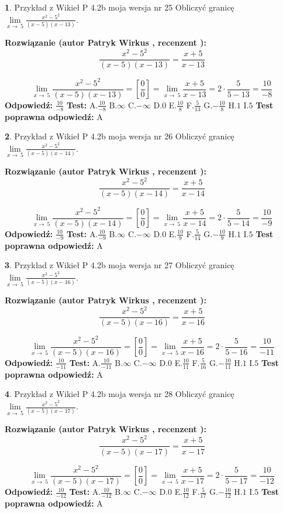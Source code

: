 \documentclass[12pt, a4paper]{article}
\theoremstyle{definition} %
\newtheorem{zad}{}
\newcommand{\zadStart}[1]{\begin{zad}#1\newline}
\newcommand{\zadStop}{\end{zad}}
\newcommand{\rozwStart}[2]{\noindent \textbf{Rozwiązanie (autor #1 , recenzent #2): }\newline}
\newcommand{\rozwStop}{\newline}
\newcommand{\odpStart}{\noindent \textbf{Odpowiedź:}\newline}
\newcommand{\odpStop}{\newline}
\newcommand{\testStart}{\noindent \textbf{Test:}\newline}
\newcommand{\testStop}{\newline}
\newcommand{\kluczStart}{\noindent \textbf{Test poprawna odpowiedź:}\newline}
\newcommand{\kluczStop}{\newline}
\begin{document}
\zadStart{Przykład z Wikieł P 4.2b moja wersja nr 25}
Obliczyć granicę $\lim\limits_{x\to\ 5}\frac{x^{2}-5^{2}}{(x-5)(x-13)}$.
\zadStop
\rozwStart{Patryk Wirkus}{}
$$\frac{x^{2}-5^{2}}{(x-5)(x-13)}=\frac{x+5}{x-13}$$

$$\lim\limits_{x\to\ 5}\frac{x^{2}-5^{2}}{(x-5)(x-13)}=[\frac{0}{0}]=\lim\limits_{x\to\ 5}\frac{x+5}{x-13}=2 \cdot \frac{5}{5-13} = \frac{10}{-8}$$
\rozwStop
\odpStart
$\frac{10}{-8}$
\odpStop
\testStart
A.$\frac{10}{-8}$
B.$\infty$
C.$-\infty$
D.$0$
E.$\frac{10}{8}$
F.$\frac{5}{13}$
G.$-\frac{10}{8}$
H.$1$
I.$5$
\testStop
\kluczStart
A
\kluczStop



\zadStart{Przykład z Wikieł P 4.2b moja wersja nr 26}
Obliczyć granicę $\lim\limits_{x\to\ 5}\frac{x^{2}-5^{2}}{(x-5)(x-14)}$.
\zadStop
\rozwStart{Patryk Wirkus}{}
$$\frac{x^{2}-5^{2}}{(x-5)(x-14)}=\frac{x+5}{x-14}$$

$$\lim\limits_{x\to\ 5}\frac{x^{2}-5^{2}}{(x-5)(x-14)}=[\frac{0}{0}]=\lim\limits_{x\to\ 5}\frac{x+5}{x-14}=2 \cdot \frac{5}{5-14} = \frac{10}{-9}$$
\rozwStop
\odpStart
$\frac{10}{-9}$
\odpStop
\testStart
A.$\frac{10}{-9}$
B.$\infty$
C.$-\infty$
D.$0$
E.$\frac{10}{9}$
F.$\frac{5}{14}$
G.$-\frac{10}{9}$
H.$1$
I.$5$
\testStop
\kluczStart
A
\kluczStop



\zadStart{Przykład z Wikieł P 4.2b moja wersja nr 27}
Obliczyć granicę $\lim\limits_{x\to\ 5}\frac{x^{2}-5^{2}}{(x-5)(x-16)}$.
\zadStop
\rozwStart{Patryk Wirkus}{}
$$\frac{x^{2}-5^{2}}{(x-5)(x-16)}=\frac{x+5}{x-16}$$

$$\lim\limits_{x\to\ 5}\frac{x^{2}-5^{2}}{(x-5)(x-16)}=[\frac{0}{0}]=\lim\limits_{x\to\ 5}\frac{x+5}{x-16}=2 \cdot \frac{5}{5-16} = \frac{10}{-11}$$
\rozwStop
\odpStart
$\frac{10}{-11}$
\odpStop
\testStart
A.$\frac{10}{-11}$
B.$\infty$
C.$-\infty$
D.$0$
E.$\frac{10}{11}$
F.$\frac{5}{16}$
G.$-\frac{10}{11}$
H.$1$
I.$5$
\testStop
\kluczStart
A
\kluczStop



\zadStart{Przykład z Wikieł P 4.2b moja wersja nr 28}
Obliczyć granicę $\lim\limits_{x\to\ 5}\frac{x^{2}-5^{2}}{(x-5)(x-17)}$.
\zadStop
\rozwStart{Patryk Wirkus}{}
$$\frac{x^{2}-5^{2}}{(x-5)(x-17)}=\frac{x+5}{x-17}$$

$$\lim\limits_{x\to\ 5}\frac{x^{2}-5^{2}}{(x-5)(x-17)}=[\frac{0}{0}]=\lim\limits_{x\to\ 5}\frac{x+5}{x-17}=2 \cdot \frac{5}{5-17} = \frac{10}{-12}$$
\rozwStop
\odpStart
$\frac{10}{-12}$
\odpStop
\testStart
A.$\frac{10}{-12}$
B.$\infty$
C.$-\infty$
D.$0$
E.$\frac{10}{12}$
F.$\frac{5}{17}$
G.$-\frac{10}{12}$
H.$1$
I.$5$
\testStop
\kluczStart
A
\kluczStop
\end{document}
